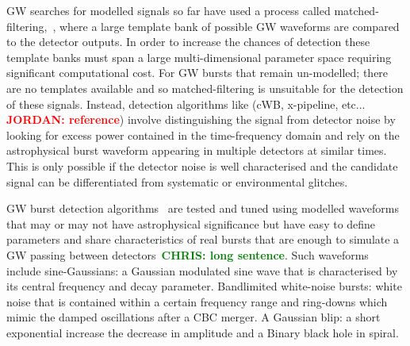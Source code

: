 \documentclass[12pt]{iopart}
\newcommand{\jordan}[1]{\textbf{\textcolor{red}{JORDAN: #1}}}
\newcommand{\chris}[1]{\textbf{\textcolor{green}{CHRIS: #1}}}
\begin{document}
%
\ac{GW} searches for modelled signals so far have used a process called
matched-filtering,~\cite{Owen1998}, where a large template bank of possible
\ac{GW} waveforms are compared to the detector outputs. In order to increase
the chances of detection these template banks must span a large
multi-dimensional parameter space requiring
significant computational cost. For \ac{GW} bursts that remain un-modelled; there are no
templates available and so matched-filtering is unsuitable for the detection of
these signals.  Instead, detection algorithms like (cWB, x-pipeline, etc... \jordan{reference}) involve distinguishing the signal from
detector noise by looking for excess power contained in the time-frequency
domain and rely on the
astrophysical burst waveform appearing in multiple detectors at similar times.
This is only possible if the detector noise is well characterised and the
candidate signal can be differentiated from systematic or environmental
glitches. 

%
\ac{GW} burst detection algorithms~\cite{Klimenko_2008, Aso_2008} are tested
and tuned using modelled waveforms that may or may not have astrophysical
significance but have easy to define parameters and share characteristics of
real bursts that are enough to simulate a \ac{GW} passing between
detectors~\chris{long sentence}. Such waveforms include sine-Gaussians: a
Gaussian modulated sine wave that is characterised by its central frequency and
decay parameter. Bandlimited white-noise bursts: white noise that is contained
within a certain frequency range and ring-downs which mimic the damped
oscillations after a \ac{CBC} merger. A Gaussian blip: a short exponential increase the decrease in amplitude and a Binary black hole in spiral. 
%

\end{document}
